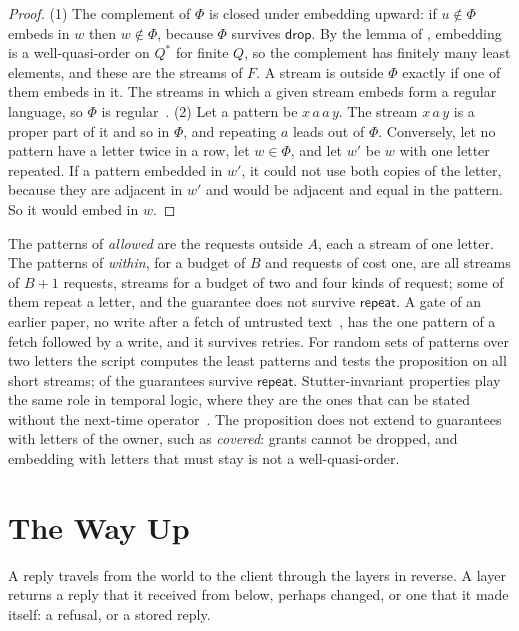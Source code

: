\documentclass[acmsmall,nonacm,screen]{acmart}
\newcommand{\kw}[1]{\mathsf{#1}}
\newcommand{\drop}{\kw{drop}}
\newcommand{\rep}{\kw{repeat}}
\newcommand{\claim}[2]{#2}
\begin{document}
\begin{proof}
(1) The complement of $\Phi$ is closed under embedding upward: if $u \notin \Phi$ embeds in
$w$ then $w \notin \Phi$, because $\Phi$ survives $\drop$. By the lemma of
\citet{higman1952}, embedding is a well-quasi-order on $Q^{*}$ for finite $Q$, so the
complement has finitely many least elements, and these are the streams of $F$. A stream is
outside $\Phi$ exactly if one of them embeds in it. The streams in which a given stream
embeds form a regular language, so $\Phi$ is regular~\cite{haines1969}. (2) Let a pattern
be $x\,a\,a\,y$. The stream $x\,a\,y$ is a proper part of it and so in $\Phi$, and repeating
$a$ leads out of $\Phi$. Conversely, let no pattern have a letter twice in a row, let $w \in
\Phi$, and let $w'$ be $w$ with one letter repeated. If a pattern embedded in $w'$, it could
not use both copies of the letter, because they are adjacent in $w'$ and would be adjacent
and equal in the pattern. So it would embed in $w$.
\end{proof}

\claim{patterns}{The patterns of \emph{allowed} are the requests outside $A$, each a stream
of one letter. The patterns of \emph{within}, for a budget of $B$ and requests of cost one,
are all streams of $B + 1$ requests, \exPatternsWithin{} streams for a budget of two and four
kinds of request; some of them repeat a letter, and the guarantee does not survive $\rep$. A gate of an earlier paper, no write after a fetch of untrusted
text~\cite{tpp7}, has the one pattern of a fetch followed by a write, and it survives
retries.} \claim{pattern-sets}{For \exPatternSets{} random sets of patterns over two letters
the script computes the least patterns and tests the proposition on all short streams;
\exPatternsRepeat{} of the guarantees survive $\rep$.} Stutter-invariant properties play the
same role in temporal logic, where they are the ones that can be stated without the
next-time operator~\cite{peled1997}. The proposition does not extend to guarantees with
letters of the owner, such as \emph{covered}: grants cannot be dropped, and embedding with
letters that must stay is not a well-quasi-order.

\section{The Way Up}
\label{sec:up}

A reply travels from the world to the client through the layers in reverse. A layer returns
a reply that it received from below, perhaps changed, or one that it made itself: a refusal,
or a stored reply.
\end{document}
